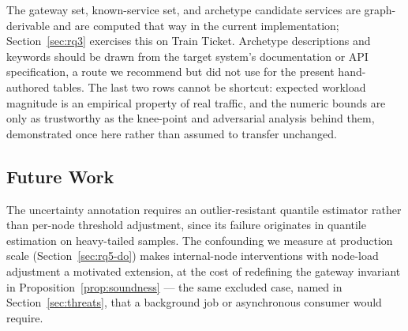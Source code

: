 \documentclass[journal, 10pt]{IEEEtran}
\begin{document}
\begin{table}[!t]
\centering
\caption{Inputs a new deployment must supply, and how much of each is automatable.}
\label{tab:general-spec}
\end{table}
The gateway set, known-service set, and archetype candidate services are
graph-derivable and are computed that way in the current implementation;
Section~\ref{sec:rq3} exercises this on Train Ticket. Archetype descriptions and
keywords should be drawn from the target system's documentation or API
specification, a route we recommend but did not use for the present hand-authored
tables. The last two rows cannot be shortcut: expected workload magnitude is an
empirical property of real traffic, and the numeric bounds are only as
trustworthy as the knee-point and adversarial analysis behind them, demonstrated
once here rather than assumed to transfer unchanged.


\subsection{Future Work}
\label{sec:future-work}
The uncertainty annotation requires an outlier-resistant quantile estimator
rather than per-node threshold adjustment, since its failure originates in
quantile estimation on heavy-tailed samples. The confounding we measure at
production scale (Section~\ref{sec:rq5-do}) makes internal-node interventions
with node-load adjustment a motivated extension, at the cost of redefining the
gateway invariant in Proposition~\ref{prop:soundness} --- the same excluded
case, named in Section~\ref{sec:threats}, that a background job or asynchronous
consumer would require.
\end{document}
